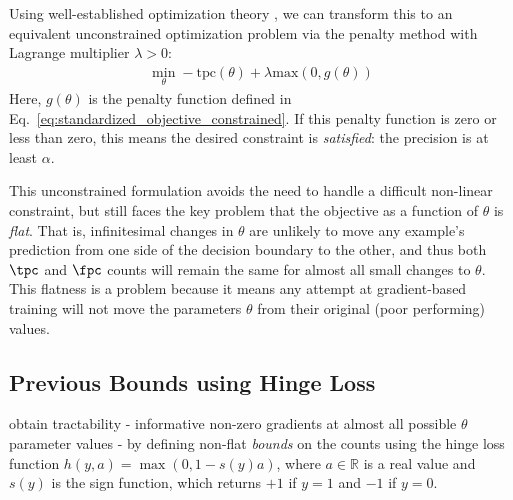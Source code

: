 Using well-established optimization theory \citep{chongChapter23Algorithms2013}, we can transform this to an equivalent unconstrained optimization problem via the penalty method with Lagrange multiplier $\lambda > 0$:
\begin{align}
\min_{\theta} - \text{tpc}(\theta) + \lambda \text{max}(0, g(\theta) )
\label{eq:standardized_objective_UNconstrained}
\end{align}
Here, $g(\theta)$ is the penalty function defined in Eq.~\eqref{eq:standardized_objective_constrained}.
If this penalty function is zero or less than zero, this means the desired constraint is \emph{satisfied}: the precision is at least $\alpha$.

This unconstrained formulation avoids the need to handle a difficult non-linear constraint, but still faces the key problem that the objective as a function of $\theta$ is \emph{flat}. That is, infinitesimal changes in $\theta$ are unlikely to move any example's prediction from one side of the decision boundary to the other, and thus both $\tpc$ and $\fpc$ counts will remain the same for almost all small changes to $\theta$. This flatness is a problem because it means any attempt at gradient-based training will not move the parameters $\theta$ from their original (poor performing) values.

\subsection{Previous Bounds using Hinge Loss}
\label{sec:methods_hinge}
\citet{ebanScalableLearningNonDecomposable2017} obtain tractability - informative non-zero gradients at almost all possible $\theta$ parameter values - by defining non-flat \emph{bounds} on the counts using the hinge loss function $h(y, a) = \max(0, 1 - s(y) a)$, where $a \in \mathbb{R}$ is a real value and $s(y)$ is the sign function, which returns $+1$ if $y = 1$ and $-1$ if $y=0$.

